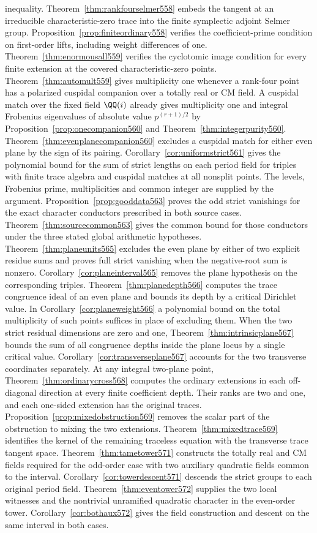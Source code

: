 \documentclass[a4paper,11pt]{article}
\theoremstyle{definition}
\theoremstyle{remark}
\numberwithin{equation}{section}
\begin{document}
inequality. Theorem~\ref{thm:rankfourselmer558} embeds the tangent at an irreducible characteristic-zero trace into the finite symplectic adjoint Selmer group. Proposition~\ref{prop:finiteordinary558} verifies the coefficient-prime condition on first-order lifts, including weight differences of one. Theorem~\ref{thm:enormousall559} verifies the cyclotomic image condition for every finite extension at the covered characteristic-zero points. Theorem~\ref{thm:automult559} gives multiplicity one whenever a rank-four point has a polarized cuspidal companion over a totally real or CM field. A cuspidal match over the fixed field \(\QQ(i)\) already gives multiplicity one and integral Frobenius eigenvalues of absolute value \(p^{(r+1)/2}\) by Proposition~\ref{prop:onecompanion560} and Theorem~\ref{thm:integerpurity560}. Theorem~\ref{thm:evenplanecompanion560} excludes a cuspidal match for either even plane by the sign of its pairing. Corollary~\ref{cor:uniformstrict561} gives the polynomial bound for the sum of strict lengths on each period field for triples with finite trace algebra and cuspidal matches at all nonsplit points. The levels, Frobenius prime, multiplicities and common integer are supplied by the argument. Proposition~\ref{prop:gooddata563} proves the odd strict vanishings for the exact character conductors prescribed in both source cases. Theorem~\ref{thm:sourcecommon563} gives the common bound for those conductors under the three stated global arithmetic hypotheses. Theorem~\ref{thm:planeunits565} excludes the even plane by either of two explicit residue sums and proves full strict vanishing when the negative-root sum is nonzero. Corollary~\ref{cor:planeinterval565} removes the plane hypothesis on the corresponding triples. Theorem~\ref{thm:planedepth566} computes the trace congruence ideal of an even plane and bounds its depth by a critical Dirichlet value. In Corollary~\ref{cor:planeweight566} a polynomial bound on the total multiplicity of such points suffices in place of excluding them. When the two strict residual dimensions are zero and one, Theorem~\ref{thm:intrinsicplane567} bounds the sum of all congruence depths inside the plane locus by a single critical value. Corollary~\ref{cor:transverseplane567} accounts for the two transverse coordinates separately. At any integral two-plane point, Theorem~\ref{thm:ordinarycross568} computes the ordinary extensions in each off-diagonal direction at every finite coefficient depth. Their ranks are two and one, and each one-sided extension has the original traces. Proposition~\ref{prop:mixedobstruction569} removes the scalar part of the obstruction to mixing the two extensions. Theorem~\ref{thm:mixedtrace569} identifies the kernel of the remaining traceless equation with the transverse trace tangent space. Theorem~\ref{thm:tametower571} constructs the totally real and CM fields required for the odd-order case with two auxiliary quadratic fields common to the interval. Corollary~\ref{cor:towerdescent571} descends the strict groups to each original period field. Theorem~\ref{thm:eventower572} supplies the two local witnesses and the nontrivial unramified quadratic character in the even-order tower. Corollary~\ref{cor:bothaux572} gives the field construction and descent on the same interval in both cases. 
\end{document}
